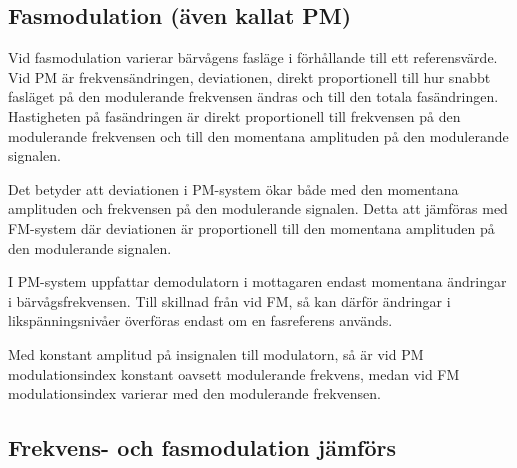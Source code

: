 \subsection{Fasmodulation (även kallat PM)}

Vid fasmodulation varierar bärvågens fasläge i förhållande till ett
referensvärde.
Vid PM är frekvensändringen, deviationen, direkt proportionell till hur
snabbt fasläget på den modulerande frekvensen ändras och till den totala
fasändringen.
Hastigheten på fasändringen är direkt proportionell till frekvensen på den
modulerande frekvensen och till den momentana amplituden på den modulerande
signalen.

Det betyder att deviationen i PM-system ökar både med den momentana amplituden
och frekvensen på den modulerande signalen.
Detta att jämföras med FM-system där deviationen är proportionell till den
momentana amplituden på den modulerande signalen.

I PM-system uppfattar demodulatorn i mottagaren endast momentana ändringar i
bärvågsfrekvensen.
Till skillnad från vid FM, så kan därför ändringar i likspänningsnivåer
överföras endast om en fasreferens används.

Med konstant amplitud på insignalen till modulatorn, så är vid PM
modulationsindex konstant oavsett modulerande frekvens, medan vid FM
modulationsindex varierar med den modulerande frekvensen.

\subsection{Frekvens- och fasmodulation jämförs}

